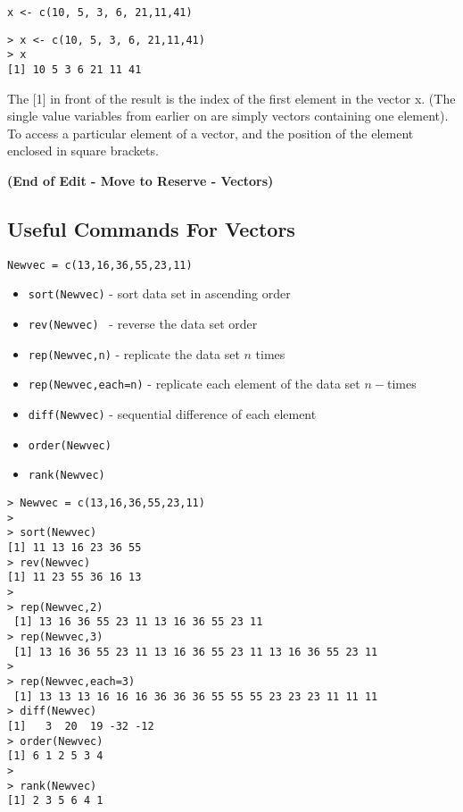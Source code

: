 \documentclass[a4paper,12pt]{article}
\begin{document}
\begin{framed}
\begin{verbatim}
x <- c(10, 5, 3, 6, 21,11,41) 
\end{verbatim}
\end{framed}
\begin{verbatim}
> x <- c(10, 5, 3, 6, 21,11,41) 
> x 
[1] 10 5 3 6 21 11 41
\end{verbatim}

The [1] in front of the result is the index of the first element in the vector x. (The single value variables from earlier on are simply vectors containing one element).
To access a particular element of a vector, and the position of the element enclosed in square brackets.

\textbf{(End of Edit - Move to Reserve - Vectors)}
\subsection{Useful Commands For Vectors}

\begin{verbatim}
Newvec = c(13,16,36,55,23,11)
\end{verbatim}
\begin{itemize}
\item \texttt{sort(Newvec)}  -  sort data set in ascending order
\item \texttt{rev(Newvec) } -  reverse the data set order
\item \texttt{rep(Newvec,n)}  -  replicate the data set $n$ times
\item \texttt{rep(Newvec,each=n)} - replicate each element of the data set $n-$times
\item \texttt{diff(Newvec)} - sequential difference of each element
\item \texttt{order(Newvec)}
\item \texttt{rank(Newvec)}
\end{itemize}


\begin{verbatim}
> Newvec = c(13,16,36,55,23,11)
>
> sort(Newvec)
[1] 11 13 16 23 36 55
> rev(Newvec)
[1] 11 23 55 36 16 13
>
> rep(Newvec,2)
 [1] 13 16 36 55 23 11 13 16 36 55 23 11
> rep(Newvec,3)
 [1] 13 16 36 55 23 11 13 16 36 55 23 11 13 16 36 55 23 11
>
> rep(Newvec,each=3)
 [1] 13 13 13 16 16 16 36 36 36 55 55 55 23 23 23 11 11 11
> diff(Newvec)
[1]   3  20  19 -32 -12
> order(Newvec)
[1] 6 1 2 5 3 4
>
> rank(Newvec)
[1] 2 3 5 6 4 1
\end{verbatim}
\end{document}
